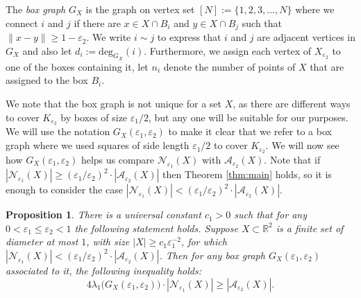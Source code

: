 \documentclass[12pt]{article}
\newtheorem{prop}[thm]{Proposition}
\newcommand{\eps}{\varepsilon}
\begin{document}
The \emph{box graph} $G_X$ is the graph on vertex set $[N]:=\{1,2,3,\ldots,N\}$ where we connect $i$ and $j$ if there are $x\in X\cap B_i$ and $y\in X\cap B_j$ such that $\|x-y\|\geq 1-\eps_2$. We write $i\sim j$ to express that $i$ and $j$ are adjacent vertices in $G_X$ and also let $d_i:=\text{deg}_{G_X}(i)$. 
Furthermore, we assign each vertex of $X_{\eps_2}$ to one of the boxes containing it, let $n_i$ denote the number of points of $X$ that are assigned to the box $B_i$.

We note that the box graph is not unique for a set $X$, as there are different ways to cover $K_{\eps_2}$ by boxes of size $\eps_1/2$, but any one will be suitable for our purposes. We will use the notation $G_X(\eps_1,\eps_2)$ to make it clear that we refer to a box graph where we used squares of side length $\eps_1/2$ to cover $K_{\eps_2}$.  We will now see how $G_X(\eps_1,\eps_2)$ helps us compare $\mathcal{N}_{\eps_1}(X)$ with $\mathcal{A}_{\eps_2}(X)$.  Note that if $|\mathcal{N}_{\eps_1}(X)|\ge (\eps_1/\eps_2)^2 \cdot|\mathcal{A}_{\eps_2}(X)|$ then Theorem \ref{thm:main} holds, so it is enough to consider the case $|\mathcal{N}_{\eps_1}(X)|< (\eps_1/\eps_2)^2 \cdot|\mathcal{A}_{\eps_2}(X)|$.

\begin{prop}\label{prop:eigen}
    There is a universal constant $c_1>0$ such that for any $0<\eps_1\leq \eps_2<1$ the following statement holds. Suppose $X\subset \mathbb{R}^2$ is a finite set of diameter at most $1$, with size $|X|\geq c_1\varepsilon_1^{-2}$, for which $|\mathcal{N}_{\eps_1}(X)|< (\eps_1/\eps_2)^2 \cdot|\mathcal{A}_{\eps_2}(X)|$. Then for any box graph $G_X(\eps_1,\eps_2)$ associated to it, the following inequality holds: $$4\lambda_1\big(G_X(\eps_1,\eps_2)\big)\cdot|\mathcal{N}_{\eps_1}(X)|\geq |\mathcal{A}_{\eps_2}(X)|.$$
\end{prop}
\end{document}

